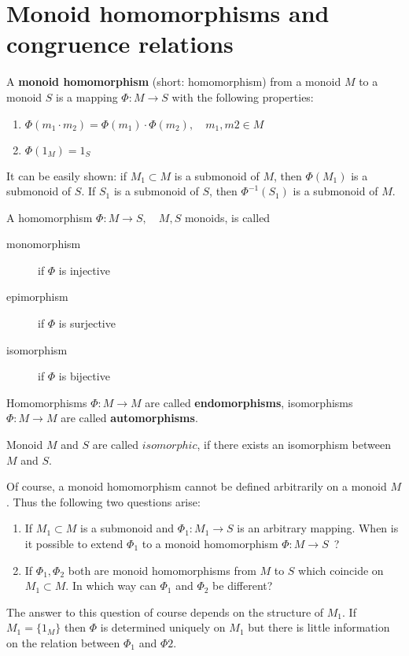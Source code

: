 \section{Monoid homomorphisms and congruence relations}

\begin{definition}
A {\bf monoid homomorphism} (short: homomorphism) from a monoid $M$ to a monoid
$S$ is a mapping $\Phi : M \to S$ with the following properties:
\begin{enumerate}
  \item $\Phi(m_1 \cdot m_2) = \Phi(m_1) \cdot \Phi(m_2), \quad m_1, m2 \in M$
  \item $\Phi(1_M) = 1_S$
\end{enumerate}
\end{definition}

It can be easily shown: if $M_1 \subset M$ is a submonoid of $M$, then
$\Phi(M_1)$ is a submonoid of $S$. If $S_1$ is a submonoid of $S$, then
$\Phi^{-1}(S_1)$ is a submonoid of $M$.

A homomorphism $\Phi : M \to S, \quad M,S$ monoids, is called
\begin{description}
  \item[monomorphism] if $\Phi$ is injective
  \item[epimorphism] if $\Phi$ is surjective
  \item[isomorphism] if $\Phi$ is bijective
\end{description}

Homomorphisms $\Phi : M \to M$ are called {\bf endomorphisms}, isomorphisms
$\Phi : M \to M$ are called {\bf automorphisms}.

Monoid $M$ and $S$ are called $isomorphic$, if there exists an isomorphism
between $M$ and $S$.

Of course, a monoid homomorphism cannot be defined arbitrarily on a monoid $M$.
Thus the following two questions arise:
\begin{enumerate}
  \item If $M_1 \subset M$ is a submonoid and $\Phi_1 : M_1 \to S$ is an arbitrary
mapping. When is it possible to extend $\Phi_1$ to a monoid homomorphism $\Phi
: M \to S$\ ?
	\item If $\Phi_1, \Phi_2$ both are monoid homomorphisms from $M$ to $S$ which
	coincide on $M_1 \subset M$. In which way can $\Phi_1$ and $\Phi_2$ be
	different? 
\end{enumerate}

The answer to this question of course depends on the structure of $M_1$. If
$M_1 = \{ 1_M \}$ then $\Phi$ is determined uniquely on $M_1$ but there is
little information on the relation between $\Phi_1$ and $\Phi2$.

